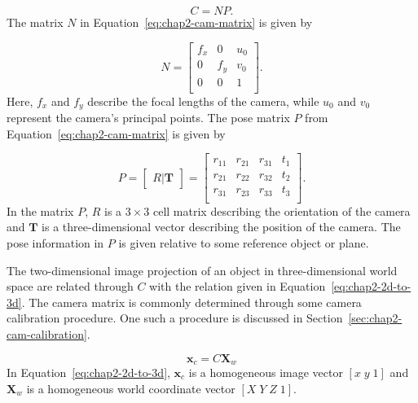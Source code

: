 \begin{equation}
  \label{eq:chap2-cam-matrix}
  C = 
  NP.
\end{equation}
The matrix $N$ in Equation~\ref{eq:chap2-cam-matrix} is given by

\begin{equation}
  \label{eq:chap2-cam-intrinsic}
  N = 
  \begin{bmatrix}
    f_x & 0   & u_0 \\
    0   & f_y & v_0 \\
    0   & 0   & 1   \\
  \end{bmatrix}.
\end{equation}
Here, $f_x$ and $f_y$ describe the focal lengths of the camera, while $u_0$ and $v_0$ represent the camera's principal points. The pose matrix $P$ from Equation~\ref{eq:chap2-cam-matrix} is given by

\begin{equation}
  \label{eq:chap2-cam-extrinsic}
  P = 
  \begin{bmatrix}
    R | \bm{T}
  \end{bmatrix}
  =
  \begin{bmatrix}
    r_{11} & r_{21} & r_{31} & t_1 \\
    r_{21} & r_{22} & r_{32} & t_2 \\
    r_{31} & r_{23} & r_{33} & t_3 \\
  \end{bmatrix}.
\end{equation}
In the matrix $P$, $R$ is a $3\times3$ cell matrix describing the orientation of the camera and $\bm{T}$ is a three-dimensional vector describing the position of the camera. The pose information in $P$ is given relative to some reference object or plane. 

The two-dimensional image projection of an object in three-dimensional world space are related through $C$ with the relation given in Equation~\ref{eq:chap2-2d-to-3d}. The camera matrix is commonly determined through some camera calibration procedure. One such a procedure is discussed in Section~\ref{sec:chap2-cam-calibration}.

\begin{equation}
  \label{eq:chap2-2d-to-3d}
  \bm{x}_c
  = C
  \bm{X}_w
\end{equation}
In Equation~\ref{eq:chap2-2d-to-3d}, $\bm{x}_c$ is a homogeneous image vector $[x\;y\;1]$ and $\bm{X}_w$ is a homogeneous world coordinate vector $[X\;Y\;Z\;1]$. 

